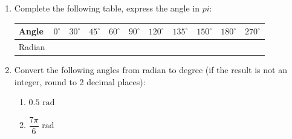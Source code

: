 \documentclass{report}
\begin{document}

\begin{enumerate}
	\item Complete the following table, express the angle in $pi$:
	          
	      \begin{tabular}{|l|c|c|c|c|c|c|c|c|c|c|}
	      	\hline Angle  & $0^{\circ}$ & $30^{\circ}$ & $45^{\circ}$ & $60^{\circ}$ & $90^{\circ}$ & $120^{\circ}$ & $135^{\circ}$ & $150^{\circ}$ & $180^{\circ}$ & $270^{\circ}$ \\
	      	\hline Radian &             &              &              &              &              &               &               &               &               &               \\
	      	\hline
	      \end{tabular}
	      \vspace{1em}
	      
	\item Convert the following angles from radian to degree (if the result is not an integer, round to 2 decimal places):
	      \vspace{-1em}
	      \begin{multicols}{2}
	      	\begin{enumerate}[label=(\alph*)]
	      		\item $0.5 \text{ rad}$
	      		\item $\dfrac{7\pi}{6} \text{ rad}$
	      	\end{enumerate}
	      \end{multicols}
\end{enumerate}

\end{document}
